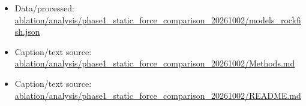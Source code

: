 \begin{itemize}[leftmargin=1.4em,noitemsep]
\item Data/processed: \begingroup\scriptsize\url{ablation/analysis/phase1_static_force_comparison_20261002/models_rockfish.json}\endgroup
\item Caption/text source: \begingroup\scriptsize\url{ablation/analysis/phase1_static_force_comparison_20261002/Methods.md}\endgroup
\item Caption/text source: \begingroup\scriptsize\url{ablation/analysis/phase1_static_force_comparison_20261002/README.md}\endgroup
\end{itemize}
